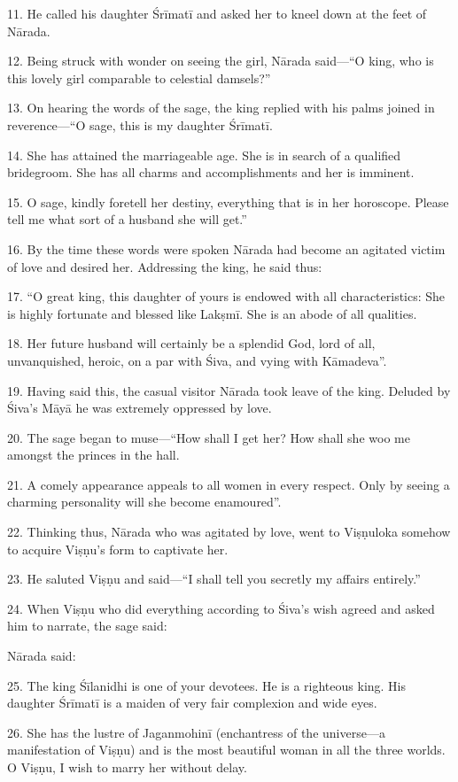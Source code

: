 11. He called his daughter Śrīmatī and asked her to kneel down at the feet of
Nārada.

12. Being struck with wonder on seeing the girl, Nārada said—“O king, who is
this lovely girl comparable to celestial damsels?”

13. On hearing the words of the sage, the king replied with his palms joined in
reverence—“O sage, this is my daughter Śrīmatī.

14. She has attained the marriageable age. She is in search of a qualified
bridegroom. She has all charms and accomplishments and her  is
imminent.

15. O sage, kindly foretell her destiny, everything that is in her horoscope.
Please tell me what sort of a husband she will get.”

16. By the time these words were spoken Nārada had become an agitated victim of
love and desired her. Addressing the king, he said thus:

17. “O great king, this daughter of yours is endowed with all characteristics:
She is highly fortunate and blessed like Lakṣmī. She is an abode of all
qualities.

18. Her future husband will certainly be a splendid God, lord of all,
unvanquished, heroic, on a par with Śiva, and vying with Kāmadeva”.

19. Having said this, the casual visitor Nārada took leave of the king. Deluded
by Śiva’s Māyā he was extremely oppressed by love.

20. The sage began to muse—“How shall I get her? How shall she woo me amongst
the princes in the  hall.

21. A comely appearance appeals to all women in every respect. Only by seeing
a charming personality will she become enamoured”.

22. Thinking thus, Nārada who was agitated by love, went to Viṣṇuloka somehow
to acquire Viṣṇu’s form to captivate her.

23. He saluted Viṣṇu and said—“I shall tell you secretly my affairs entirely.”

24. When Viṣṇu who did everything according to Śiva’s wish agreed and asked him
to narrate, the sage said:

Nārada said:

25. The king Śīlanidhi is one of your devotees. He is a righteous king. His
daughter Śrīmatī is a maiden of very fair complexion and wide eyes.

26. She has the lustre of Jaganmohinī (enchantress of the universe—a
manifestation of Viṣṇu) and is the most beautiful woman in all the three worlds.
O Viṣṇu, I wish to marry her without delay.

